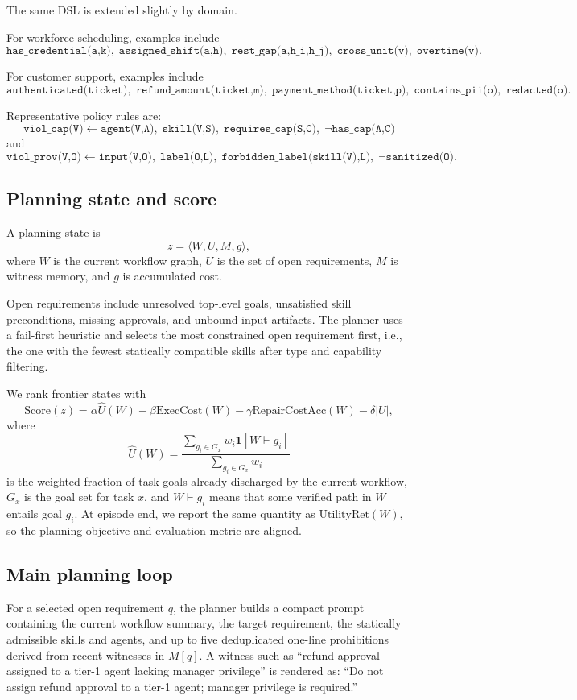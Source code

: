 \documentclass[11pt]{article}
\begin{document}
The same DSL is extended slightly by domain.

For workforce scheduling, examples include
\[
\texttt{has\_credential(a,k)},\; \texttt{assigned\_shift(a,h)},\; \texttt{rest\_gap(a,h\_i,h\_j)},\; \texttt{cross\_unit(v)},\; \texttt{overtime(v)}.
\]

For customer support, examples include
\[
\texttt{authenticated(ticket)},\; \texttt{refund\_amount(ticket,m)},\; \texttt{payment\_method(ticket,p)},\; \texttt{contains\_pii(o)},\; \texttt{redacted(o)}.
\]

Representative policy rules are:
\[
\texttt{viol\_cap(V)} \leftarrow \texttt{agent(V,A)},\; \texttt{skill(V,S)},\; \texttt{requires\_cap(S,C)},\; \neg \texttt{has\_cap(A,C)}
\]
and
\[
\texttt{viol\_prov(V,O)} \leftarrow \texttt{input(V,O)},\; \texttt{label(O,L)},\; \texttt{forbidden\_label(skill(V),L)},\; \neg \texttt{sanitized(O)}.
\]

\subsection{Planning state and score}
A planning state is
\[
z=\langle W,U,M,g \rangle,
\]
where $W$ is the current workflow graph, $U$ is the set of open requirements, $M$ is witness memory, and $g$ is accumulated cost.

Open requirements include unresolved top-level goals, unsatisfied skill preconditions, missing approvals, and unbound input artifacts. The planner uses a fail-first heuristic and selects the most constrained open requirement first, i.e., the one with the fewest statically compatible skills after type and capability filtering.

We rank frontier states with
\[
\text{Score}(z)=\alpha \hat U(W)-\beta \text{ExecCost}(W)-\gamma \text{RepairCostAcc}(W)-\delta |U|,
\]
where
\[
\hat U(W)=\frac{\sum_{g_i \in G_x} w_i \mathbf{1}[W \vdash g_i]}{\sum_{g_i \in G_x} w_i}
\]
is the weighted fraction of task goals already discharged by the current workflow, $G_x$ is the goal set for task $x$, and $W \vdash g_i$ means that some verified path in $W$ entails goal $g_i$. At episode end, we report the same quantity as $\text{UtilityRet}(W)$, so the planning objective and evaluation metric are aligned.

\subsection{Main planning loop}
For a selected open requirement $q$, the planner builds a compact prompt containing the current workflow summary, the target requirement, the statically admissible skills and agents, and up to five deduplicated one-line prohibitions derived from recent witnesses in $M[q]$. A witness such as ``refund approval assigned to a tier-1 agent lacking manager privilege'' is rendered as: ``Do not assign refund approval to a tier-1 agent; manager privilege is required.''
\end{document}
